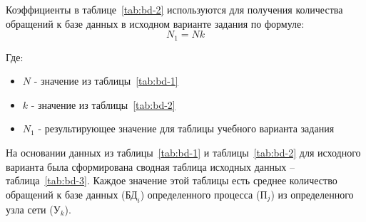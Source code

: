 \documentclass[russian,utf8,emptystyle]{eskdtext}
\begin{document}
Коэффициенты в таблице~\ref{tab:bd-2} используются для получения количества обращений к базе данных в исходном варианте задания по формуле:
$$
	N_1 = N k
$$

Где:
\begin{itemize}[label=-]
\item $N$ - значение из таблицы~\ref{tab:bd-1}
\item $k$ - значение из таблицы~\ref{tab:bd-2}
\item $N_1$ - результирующее значение для таблицы учебного варианта задания
\end{itemize}

На основании данных из таблицы~\ref{tab:bd-1} и таблицы~\ref{tab:bd-2} для исходного варианта была сформирована сводная таблица исходных данных – таблица~\ref{tab:bd-3}. Каждое значение этой таблицы есть среднее количество обращений к базе данных ($\text{БД}_i$) определенного процесса ($\text{П}_j$) из определенного узла сети ($\text{У}_k$).
\end{document}
